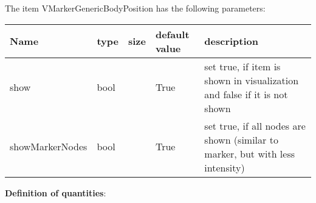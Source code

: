 The item VMarkerGenericBodyPosition has the following parameters:\vspace{-1cm}\\ 
\begin{center}
  \footnotesize
  \begin{longtable}{| p{4.5cm} | p{2.5cm} | p{0.5cm} | p{2.5cm} | p{6cm} |}
    \hline
    \bf Name & \bf type & \bf size & \bf default value & \bf description \\ \hline
    show &     bool &      &     True &     set true, if item is shown in visualization and false if it is not shown\\ \hline
    showMarkerNodes &     bool &      &     True &     set true, if all nodes are shown (similar to marker, but with less intensity)\\ \hline
	  \end{longtable}
	\end{center}
{\bf Definition of quantities}:\\
\newpage

